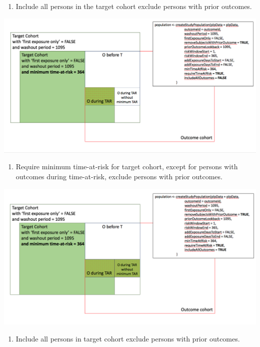 \documentclass[]{book}
\providecommand{\tightlist}{%
  \setlength{\itemsep}{0pt}\setlength{\parskip}{0pt}}
\begin{document}
\newpage

\begin{enumerate}
\def\labelenumi{\arabic{enumi}.}
\setcounter{enumi}{2}
\tightlist
\item
  Include all persons in the target cohort exclude persons with prior
  outcomes.
\end{enumerate}

\includegraphics{images/PatientLevelPrediction/popdef3.png}

\begin{enumerate}
\def\labelenumi{\arabic{enumi}.}
\setcounter{enumi}{3}
\tightlist
\item
  Require minimum time-at-risk for target cohort, except for persons
  with outcomes during time-at-risk, exclude persons with prior
  outcomes.
\end{enumerate}

\includegraphics{images/PatientLevelPrediction/popdef4.png}

\newpage

\begin{enumerate}
\def\labelenumi{\arabic{enumi}.}
\setcounter{enumi}{4}
\tightlist
\item
  Include all persons in target cohort exclude persons with prior
  outcomes.
\end{enumerate}
\end{document}
